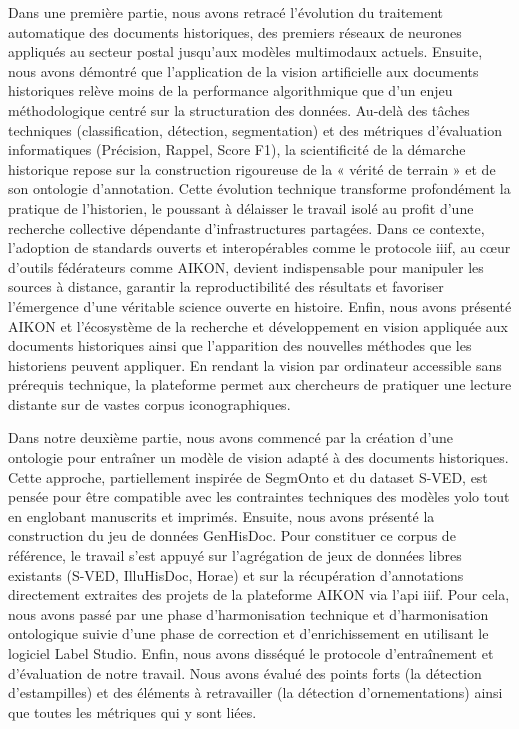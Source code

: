 Dans une première partie, nous avons retracé l'évolution du traitement automatique des documents historiques, des premiers réseaux de neurones appliqués au secteur postal jusqu'aux modèles multimodaux actuels. Ensuite, nous avons démontré que l'application de la vision artificielle aux documents historiques relève moins de la performance algorithmique que d'un enjeu méthodologique centré sur la structuration des données. Au-delà des tâches techniques (classification, détection, segmentation) et des métriques d'évaluation informatiques (Précision, Rappel, Score F1), la scientificité de la démarche historique repose sur la construction rigoureuse de la « vérité de terrain » et de son ontologie d'annotation. Cette évolution technique transforme profondément la pratique de l'historien, le poussant à délaisser le travail isolé au profit d'une recherche collective dépendante d'infrastructures partagées. Dans ce contexte, l'adoption de standards ouverts et interopérables comme le protocole \gls{iiif}, au cœur d'outils fédérateurs comme AIKON, devient indispensable pour manipuler les sources à distance, garantir la reproductibilité des résultats et favoriser l'émergence d'une véritable science ouverte en histoire. Enfin, nous avons présenté AIKON et l'écosystème de la recherche et développement en vision appliquée aux documents historiques ainsi que l'apparition des nouvelles méthodes que les historiens peuvent appliquer. En rendant la vision par ordinateur accessible sans prérequis technique, la plateforme permet aux chercheurs de pratiquer une \og lecture distante \fg{} sur de vastes corpus iconographiques.

Dans notre deuxième partie, nous avons commencé par la création d'une ontologie pour entraîner un modèle de vision adapté à des documents historiques. Cette approche, partiellement inspirée de SegmOnto et du dataset S-VED, est pensée pour être compatible avec les contraintes techniques des modèles \gls{yolo} tout en englobant manuscrits et imprimés. Ensuite, nous avons présenté la construction du jeu de données GenHisDoc. Pour constituer ce corpus de référence, le travail s'est appuyé sur l'agrégation de jeux de données libres existants (S-VED, IlluHisDoc, Horae) et sur la récupération d'annotations directement extraites des projets de la plateforme AIKON via l'\gls{api} \gls{iiif}. Pour cela, nous avons passé par une phase d'harmonisation technique et d'harmonisation ontologique suivie d'une phase de correction et d'enrichissement en utilisant le logiciel Label Studio.  Enfin, nous avons disséqué le protocole d'entraînement et d'évaluation de notre travail. Nous avons évalué des points forts (la détection d'estampilles) et des éléments à retravailler (la détection d'ornementations) ainsi que toutes les métriques qui y sont liées. 


